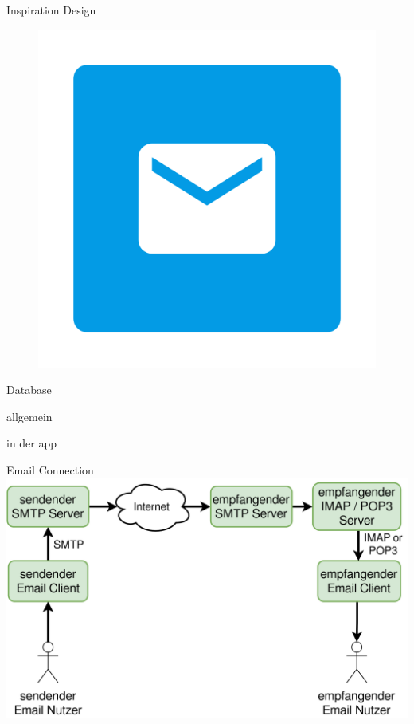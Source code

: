 \documentclass[aspectratio=169]{beamer}
\begin{document}
\begin{frame}{Inspiration Design}
\begin{varwidth}{.3\textwidth}
\begin{figure}
        \end{figure}
    \end{varwidth} 
    \hfill
    \begin{varwidth}{.3\textwidth}\pause
        \begin{figure}
        \centering
        \includegraphics[width=.9\textwidth]{media/fairmail-logo.png}
        \end{figure}
\end{varwidth} 
\end{frame}

\begin{frame}{Database}
\begin{block}{allgemein}
\end{block}

\begin{block}{in der app}
\end{block}
\end{frame}

\begin{frame}{Email Connection}
\centering
\includegraphics[width=.8\textwidth]{../maturText/media/connection-diagram.png}
\end{frame}
\end{document}
